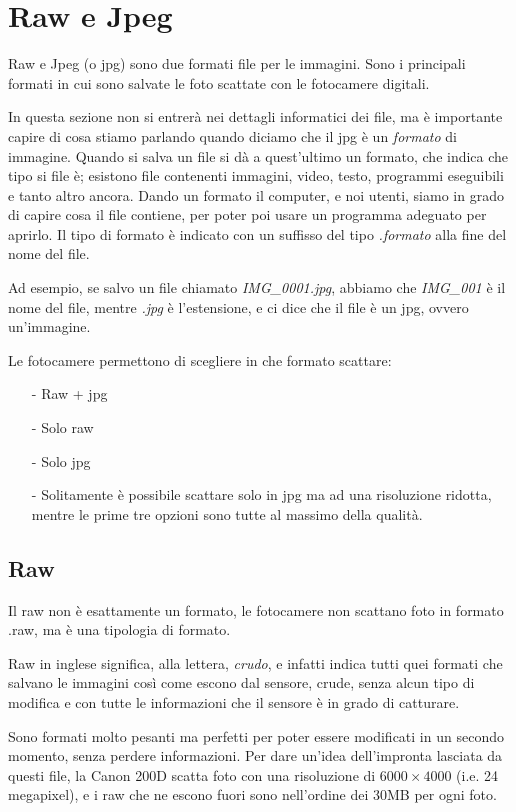 \section{Raw e Jpeg} \label{sec:rawjpeg}
Raw e Jpeg (o jpg) sono due formati file per le immagini.
Sono i principali formati in cui sono salvate le foto scattate con le fotocamere digitali.

In questa sezione non si entrerà nei dettagli informatici dei file, ma è importante capire di cosa stiamo parlando quando diciamo che il jpg è un \textit{formato} di immagine.
Quando si salva un file si dà a quest'ultimo un formato, che indica che tipo si file è; esistono file contenenti immagini, video, testo, programmi eseguibili e tanto altro ancora.
Dando un formato il computer, e noi utenti, siamo in grado di capire cosa il file contiene, per poter poi usare un programma adeguato per aprirlo. Il tipo di formato è indicato con un suffisso del tipo \textit{.formato} alla fine del nome del file.

Ad esempio, se salvo un file chiamato \textit{IMG\_0001.jpg}, abbiamo che \textit{IMG\_001} è il nome del file, mentre \textit{.jpg} è l'estensione, e ci dice che il file è un jpg, ovvero un'immagine.


Le fotocamere permettono di scegliere in che formato scattare:
\begin{itemize}
    \item[-] Raw + jpg
    \item[-] Solo raw
    \item[-] Solo jpg
    \item[-] Solitamente è possibile scattare solo in jpg ma ad una risoluzione ridotta, mentre le prime tre opzioni sono tutte al massimo della qualità.   
\end{itemize}


\subsection{Raw} \label{subsec:raw}
Il raw non è esattamente un formato, le fotocamere non scattano foto in formato .raw, ma è una tipologia di formato.

Raw in inglese significa, alla lettera, \textit{crudo}, e infatti indica tutti quei formati che salvano le immagini così come escono dal sensore, crude, senza alcun tipo di modifica e con tutte le informazioni che il sensore è in grado di catturare.

Sono formati molto pesanti ma perfetti per poter essere modificati in un secondo momento, senza perdere informazioni.
Per dare un'idea dell'impronta lasciata da questi file, la Canon 200D scatta foto con una risoluzione di $6000 \times 4000$ (i.e. 24 megapixel), e i raw che ne escono fuori sono nell'ordine dei 30MB per ogni foto.

